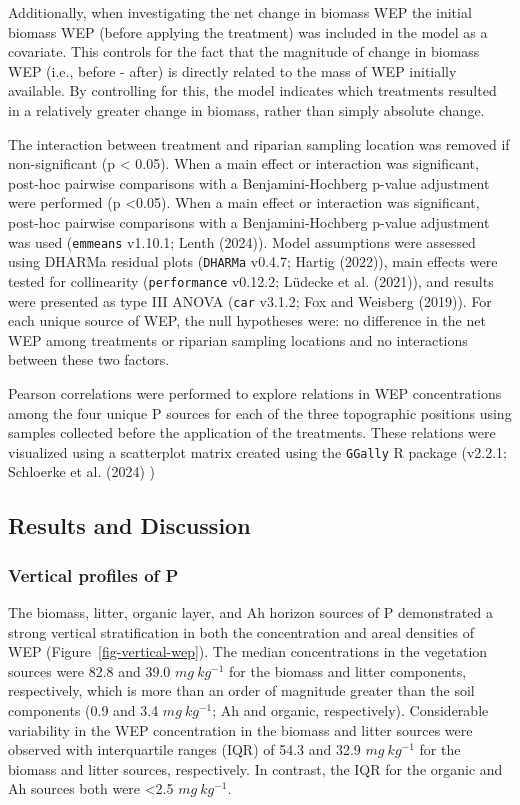 \documentclass[
]{agujournal2019}
\begin{document}
Additionally, when investigating the net change in biomass WEP the
initial biomass WEP (before applying the treatment) was included in the
model as a covariate. This controls for the fact that the magnitude of
change in biomass WEP (i.e., before - after) is directly related to the
mass of WEP initially available. By controlling for this, the model
indicates which treatments resulted in a relatively greater change in
biomass, rather than simply absolute change.

The interaction between treatment and riparian sampling location was
removed if non-significant (p \textless{} 0.05). When a main effect or
interaction was significant, post-hoc pairwise comparisons with a
Benjamini-Hochberg p-value adjustment were performed (p \textless0.05).
When a main effect or interaction was significant, post-hoc pairwise
comparisons with a Benjamini-Hochberg p-value adjustment was used
(\texttt{emmeans} v1.10.1; Lenth (2024)). Model assumptions were
assessed using DHARMa residual plots (\texttt{DHARMa} v0.4.7; Hartig
(2022)), main effects were tested for collinearity (\texttt{performance}
v0.12.2; Lüdecke et al. (2021)), and results were presented as type III
ANOVA (\texttt{car} v3.1.2; Fox and Weisberg (2019)). For each unique
source of WEP, the null hypotheses were: no difference in the net WEP
among treatments or riparian sampling locations and no interactions
between these two factors.

Pearson correlations were performed to explore relations in WEP
concentrations among the four unique P sources for each of the three
topographic positions using samples collected before the application of
the treatments. These relations were visualized using a scatterplot
matrix created using the \texttt{GGally} R package (v2.2.1; Schloerke et
al. (2024) )

\subsection{Results and Discussion}\label{results-and-discussion}

\subsubsection{Vertical profiles of P}\label{vertical-profiles-of-p}

The biomass, litter, organic layer, and Ah horizon sources of P
demonstrated a strong vertical stratification in both the concentration
and areal densities of WEP (Figure~\ref{fig-vertical-wep}). The median
concentrations in the vegetation sources were 82.8 and 39.0
\(mg~kg^{-1}\) for the biomass and litter components, respectively,
which is more than an order of magnitude greater than the soil
components (0.9 and 3.4 \(mg~kg^{-1}\); Ah and organic, respectively).
Considerable variability in the WEP concentration in the biomass and
litter sources were observed with interquartile ranges (IQR) of 54.3 and
32.9 \(mg~kg^{-1}\) for the biomass and litter sources, respectively. In
contrast, the IQR for the organic and Ah sources both were \textless2.5
\(mg~kg^{-1}\).
\end{document}
